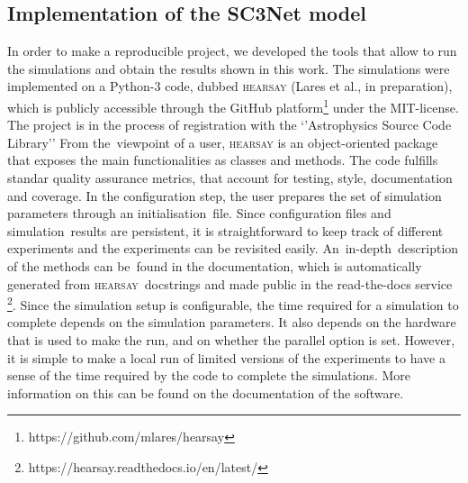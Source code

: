 \documentclass[crop]{CSLB}
\newcommand{\hs}{\textsc{hearsay}}
\begin{document}
\subsection{Implementation of the SC3Net model}

%
In order to make a reproducible project, we developed the tools that
allow to run the simulations and obtain the results shown in this
work.
%
The simulations were implemented on a Python-3 code, dubbed \hs{}
(Lares et al., in preparation), which is publicly accessible through
the GitHub platform\footnote{https://github.com/mlares/hearsay} under
the MIT-license.
%
The project is in the process of registration with the ‘’Astrophysics
Source Code Library’’ \citep[ASCL, ][]{2015JORS....3E..15A,
2020ASPC..522..731A}
%
From the viewpoint of a user, \hs{} is an object-oriented package that
exposes the main functionalities as classes and methods.
%
The code fulfills standar quality assurance metrics, that account for
testing, style, documentation and coverage.
%
In the configuration step, the user prepares the set of simulation
parameters through an initialisation file.
%
Since configuration files and simulation results are persistent, it is
straightforward to keep track of different experiments and the
experiments can be revisited easily.
%
An in-depth description of the methods can be found in the
documentation, which is automatically generated from \hs{} docstrings
and made public in the read-the-docs service
\footnote{https://hearsay.readthedocs.io/en/latest/}.
%
Since the simulation setup is configurable, the time required for a
simulation to complete depends on the simulation parameters.
%
It also depends on the hardware that is used to make the run, and on
whether the parallel option is set.
%
However, it is simple to make a local run of limited versions of the
experiments to have a sense of the time required by the code to
complete the simulations.
%
More information on this can be found on the documentation of the
software.
\end{document}

